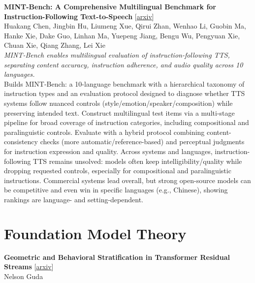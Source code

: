 \documentclass[12pt,letterpaper]{article}
\begin{document}
\medskip

{\small\textbf{MINT-Bench: A Comprehensive Multilingual Benchmark for Instruction-Following Text-to-Speech}} {\scriptsize[\href{https://arxiv.org/abs/2604.17958}{arxiv}]}\\
{\scriptsize Huakang Chen, Jingbin Hu, Liumeng Xue, Qirui Zhan, Wenhao Li, Guobin Ma, Hanke Xie, Dake Guo, Linhan Ma, Yuepeng Jiang, Bengu Wu, Pengyuan Xie, Chuan Xie, Qiang Zhang, Lei Xie}\\

{\small\textit{MINT-Bench enables multilingual evaluation of instruction-following TTS, separating content accuracy, instruction adherence, and audio quality across 10 languages.}}\\[1pt]
{\footnotesize Builds MINT-Bench: a 10-language benchmark with a hierarchical taxonomy of instruction types and an evaluation protocol designed to diagnose whether TTS systems follow nuanced controls (style/emotion/speaker/composition) while preserving intended text. Construct multilingual test items via a multi-stage pipeline for broad coverage of instruction categories, including compositional and paralinguistic controls. Evaluate with a hybrid protocol combining content-consistency checks (more automatic/reference-based) and perceptual judgments for instruction expression and quality. Across systems and languages, instruction-following TTS remains unsolved: models often keep intelligibility/quality while dropping requested controls, especially for compositional and paralinguistic instructions. Commercial systems lead overall, but strong open-source models can be competitive and even win in specific languages (e.g., Chinese), showing rankings are language- and setting-dependent.}

\medskip


\section*{Foundation Model Theory}

{\small\textbf{Geometric and Behavioral Stratification in Transformer Residual Streams}} {\scriptsize[\href{https://arxiv.org/abs/2608.12447}{arxiv}]}\\
{\scriptsize Nelson Guda}\\
\end{document}
